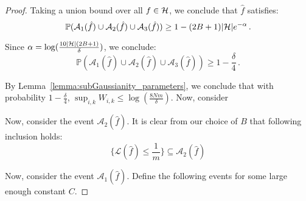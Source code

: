 \begin{proof}
Taking a union bound over all $f \in \mathcal{H}$, we conclude that $\hat{f}$ satisfies:
$$\mathbb{P}(\mathcal{A}_1(\hat{f})\cup\mathcal{A}_2(\hat{f})\cup \mathcal{A}_3(\hat{f})) \geq 1- (2B+1)|\mathcal{\mathcal{H}}|e^{-\alpha}\,.$$

Since $\alpha = \log(\tfrac{10 |\mathcal{\mathcal{H}}|(2B+1)}{\delta})$, we conclude:
\begin{equation}\label{eq:p_bound_1}
\mathbb{P}(\mathcal{A}_1(\hat{f})\cup\mathcal{A}_2(\hat{f})\cup \mathcal{A}_3(\hat{f})) \geq 1- \frac{\delta}{4}\,.\end{equation}

By Lemma~\ref{lemma:subGaussianity_parameters}, we conclude that with probability $1-\frac{\delta}{4}$, $\sup_{i,k}W_{i,k} \leq \log(\frac{8Nm}{\delta})$. Now, consider 

Now, consider the event $\mathcal{A}_2(\hat{f})$. It is clear from our choice of $B$ that following inclusion holds:
\begin{equation}
\{\mathcal{L}(\hat{f}) \leq \frac{1}{m} \} \subseteq \mathcal{A}_2(\hat{f})
\end{equation}

Now, consider the event $\mathcal{A}_1(\hat{f})$. Define the following events for some large enough constant $C$.


\end{proof}

